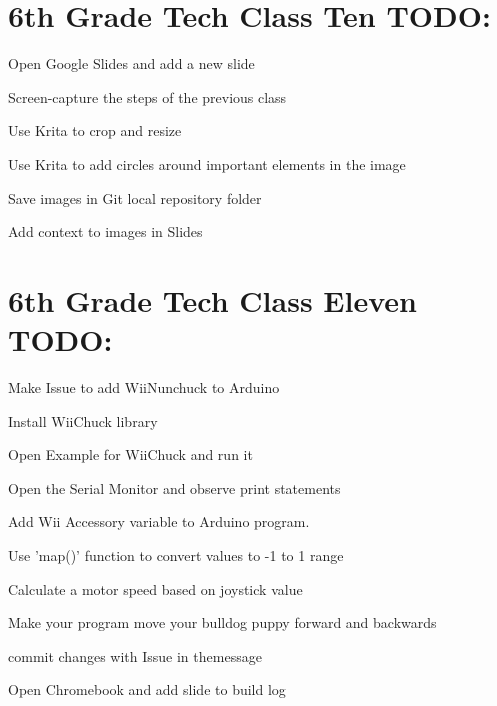 \documentclass{article}
\begin{document}
\section{6th Grade Tech Class Ten TODO:}
\begin{todolist}
	\item Open Google Slides and add a new slide
	\item Screen-capture the steps of the previous class
	\item Use Krita to crop and resize
	\item Use Krita to add circles around important elements in the image
	\item Save images in Git local repository folder
	\item Add context to images in Slides 
\end{todolist}
\newpage
\section{6th Grade Tech Class Eleven TODO:}
\begin{todolist}
	\item Make Issue to add WiiNunchuck to Arduino
	\item Install WiiChuck library
	\item Open Example for WiiChuck and run it
	\item Open the Serial Monitor and observe print statements
	\item Add Wii Accessory variable to Arduino program. 
	\item Use 'map()' function to convert values to -1 to 1 range
	\item Calculate a motor speed based on joystick value
	\item Make your program move your bulldog puppy forward and backwards
	\item commit changes with Issue in themessage
	\item Open Chromebook and add slide to build log
\end{todolist}
\newpage
\end{document}
